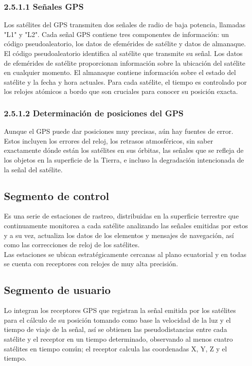 \subsubsection{2.5.1.1 Señales GPS}
Los satélites del GPS transmiten dos señales de radio de baja potencia, llamadas "L1" y "L2". Cada señal GPS contiene tres componentes de información: un código pseudoaleatorio, los datos de efemérides de satélite y datos de almanaque. El código pseudoaleatorio identifica al satélite que transmite su señal. Los datos de efemérides de satélite proporcionan información sobre la ubicación del satélite en cualquier momento. El almanaque contiene información sobre el estado del satélite y la fecha y hora actuales. Para cada satélite, el tiempo es controlado por los relojes atómicos a bordo que son cruciales para conocer su posición exacta. 


\subsubsection{2.5.1.2 Determinación de posiciones del GPS}
Aunque el GPS puede dar posiciones muy precisas, aún hay fuentes de error. Estos incluyen los errores del reloj, los retrasos atmosféricos, sin saber exactamente dónde están los satélites en sus órbitas, las señales que se refleja de los objetos en la superficie de la Tierra, e incluso la degradación intencionada de la señal del satélite. 

\subsection{Segmento de control}
Es una serie de estaciones de rastreo, distribuidas en la superficie terrestre que continuamente monitorea a cada satélite analizando las señales emitidas por estos y a su vez, actualiza los datos de los elementos y mensajes de navegación, así como las correcciones de reloj de los satélites.\\Las estaciones se ubican estratégicamente cercanas al plano ecuatorial y en todas se cuenta con receptores con relojes de muy alta precisión.
\subsection{Segmento de usuario}
Lo integran los receptores GPS que registran la señal emitida por los satélites para el cálculo de su posición tomando como base la velocidad de la luz y el tiempo de viaje de la señal, así se obtienen las pseudodistancias entre cada satélite y el receptor en un tiempo determinado, observando al menos cuatro satélites en tiempo común; el receptor calcula las coordenadas X, Y, Z y el tiempo.

